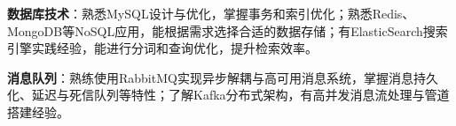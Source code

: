 \item \textbf{数据库技术}：熟悉MySQL设计与优化，掌握事务和索引优化；熟悉Redis、MongoDB等NoSQL应用，能根据需求选择合适的数据存储；有ElasticSearch搜索引擎实践经验，能进行分词和查询优化，提升检索效率。
\item \textbf{消息队列}：熟练使用RabbitMQ实现异步解耦与高可用消息系统，掌握消息持久化、延迟与死信队列等特性；了解Kafka分布式架构，有高并发消息流处理与管道搭建经验。
